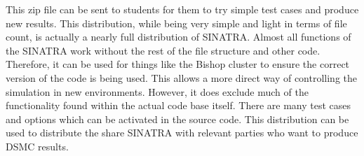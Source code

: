 \indent This zip file can be sent to students for them to try simple test cases and produce new results. This distribution, while being very simple and light in terms of file count, is actually a nearly full distribution of SINATRA. Almost all functions of the SINATRA work without the rest of the file structure and other code. Therefore, it can be used for things like the Bishop cluster to ensure the correct version of the code is being used. This allows a more direct way of controlling the simulation in new environments. However, it does exclude much of the functionality found within the actual code base itself. There are many test cases and options which can be activated in the source code. This distribution can be used to distribute the share SINATRA with relevant parties who want to produce DSMC results.
